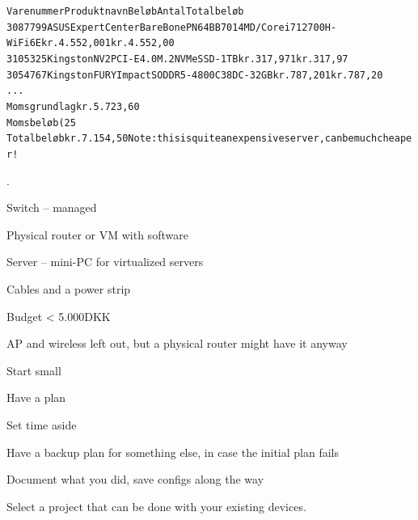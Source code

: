 \documentclass[Screen16to9,17pt]{foils}
\begin{document}


\begin{alltt}\scriptsize
Varenummer  Produktnavn                                                             Beløb Antal Totalbeløb
3087799     ASUS ExpertCenter BareBone PN64 BB7014MD / Core i7 12700H - WiFi 6E kr. 4.552,00 1 kr. 4.552,00
3105325 Kingston NV2 PCI-E 4.0 M.2 NVMe SSD - 1TB kr. 317,97 1 kr. 317,97
3054767 Kingston FURY Impact SO DDR5-4800 C38 DC - 32GB kr. 787,20 1 kr. 787,20
...
Momsgrundlag kr. 5.723,60
Momsbeløb (25%
Totalbeløb kr. 7.154,50        Note: this is quite an expensive server, can be much cheaper!
\end{alltt}




.

\begin{list2}
\item Switch -- managed
\item Physical router or VM with software
\item Server -- mini-PC for virtualized servers
\item Cables and a power strip
\end{list2}

Budget < 5.000DKK

\vskip 2cm
AP and wireless left out, but a physical router might have it anyway





\begin{list2}
\item Start small
\item Have a plan
\item Set time aside
\item Have a backup plan for something else, in case the initial plan fails
\item Document what you did, save configs along the way
\end{list2}

Select a project that can be done with your existing devices.


\end{document}
